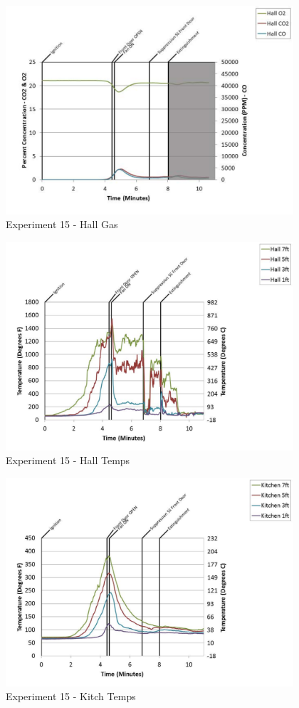 \documentclass{article}
\begin{document}
\begin{appendices}
	\clearpage

	\begin{figure}[h!]
		\centering
		\includegraphics[height=3.05in]{0_Images/Results_Charts/Exp_15_Charts/HallGas.pdf}
		\caption{Experiment 15 - Hall Gas}
	\end{figure}
 

	\begin{figure}[h!]
		\centering
		\includegraphics[height=3.05in]{0_Images/Results_Charts/Exp_15_Charts/HallTemps.pdf}
		\caption{Experiment 15 - Hall Temps}
	\end{figure}
 
	\clearpage

	\begin{figure}[h!]
		\centering
		\includegraphics[height=3.05in]{0_Images/Results_Charts/Exp_15_Charts/KitchTemps.pdf}
		\caption{Experiment 15 - Kitch Temps}
	\end{figure}
 


\end{appendices}
\end{document}
